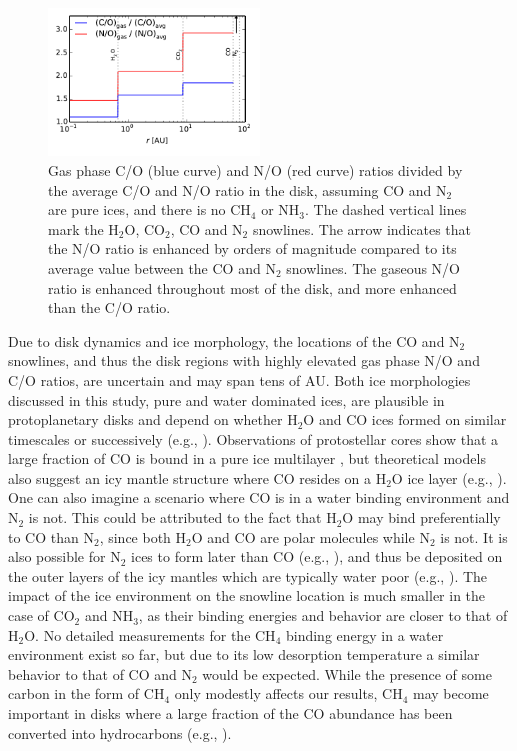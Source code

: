 \documentclass[apj]{emulateapj}
\begin{document}
\begin{figure}[h!]
\centering
\includegraphics[width=0.5\textwidth]{CN_norm.pdf}
\caption{Gas phase C/O (blue curve) and N/O (red curve) ratios divided by the average C/O and N/O ratio in the disk, assuming CO and N$_2$ are pure ices, and there is no CH$_4$ or NH$_3$. The dashed vertical lines mark the H$_2$O, CO$_2$, CO and N$_2$ snowlines. The arrow indicates that the N/O ratio is enhanced by orders of magnitude compared to its average value between the CO and N$_2$ snowlines. The gaseous N/O ratio is enhanced throughout most of the disk, and more enhanced than the C/O ratio.}  
\label{fig:enhance}
\end{figure}




Due to disk dynamics and ice morphology, the locations of the CO and N$_2$ snowlines, and thus the disk regions with highly elevated gas phase N/O and C/O ratios, are uncertain and may span tens of AU. Both ice morphologies discussed in this study, pure and water dominated ices, are plausible in protoplanetary disks and depend on whether H$_2$O and CO ices formed on similar timescales or successively (e.g., \citealt{garrod11}). Observations of protostellar cores show that a large fraction of CO is bound in a pure ice multilayer \citep{pontoppidan03}, but theoretical models also suggest an icy mantle structure where CO resides on a H$_2$O ice layer (e.g., \citealt{collings03}). One can also imagine a scenario where CO is in a water binding environment and N$_2$ is not. This could be attributed to the fact that H$_2$O may bind preferentially to CO than N$_2$, since both H$_2$O and CO are polar molecules while N$_2$ is not. It is also possible for N$_2$ ices to form later than CO (e.g., \citealt{pagani12}), and thus be deposited on the outer layers of the icy mantles which are typically water poor (e.g., \citealt{garrod11}). The impact of the ice environment on the snowline location is much smaller in the case of CO$_2$ and NH$_3$, as their binding energies and behavior are closer to that of H$_2$O. No detailed measurements for the CH$_4$ binding energy in a water environment exist so far, but due to its low desorption temperature a similar behavior to that of CO and N$_2$ would be expected. While the presence of some carbon in the form of CH$_4$ only modestly affects our results, CH$_4$ may become important in disks where a large fraction of the CO abundance has been converted into hydrocarbons (e.g., \citealt{du15}). 
\end{document}

